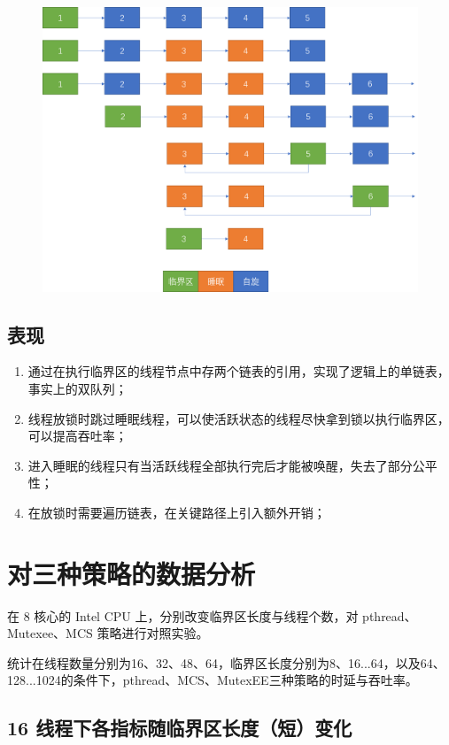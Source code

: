 \documentclass[UTF8]{ctexart}
\begin{document}
\begin{figure}[ht]
    \centering
    \includegraphics[scale=0.5]{images/img5.png}
\end{figure}

\subsection{表现}

\begin{enumerate}
    \item 通过在执行临界区的线程节点中存两个链表的引用，实现了逻辑上的单链表，事实上的双队列；
    \item 线程放锁时跳过睡眠线程，可以使活跃状态的线程尽快拿到锁以执行临界区，可以提高吞吐率；
    \item 进入睡眠的线程只有当活跃线程全部执行完后才能被唤醒，失去了部分公平性；
    \item 在放锁时需要遍历链表，在关键路径上引入额外开销；
\end{enumerate}

\section{对三种策略的数据分析}

在 8 核心的 Intel CPU 上，分别改变临界区长度与线程个数，对 pthread、Mutexee、MCS 策略进行对照实验。

统计在线程数量分别为16、32、48、64，临界区长度分别为8、16...64，以及64、128...1024的条件下，pthread、MCS、MutexEE三种策略的时延与吞吐率。

\subsection{16 线程下各指标随临界区长度（短）变化}
\end{document}
